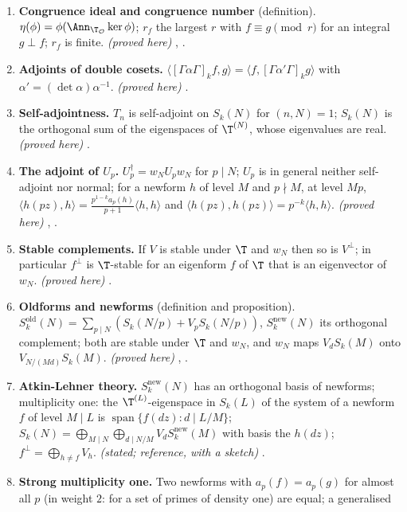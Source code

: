 \begin{enumerate}[label=\textbf{\thechapter.\arabic*}]
\item \textbf{Congruence ideal and congruence number} (definition). $\eta(\phi)=\phi(\Ann_{\T_{\mathcal O}}\ker\phi)$; $r_f$ the largest $r$ with $f\equiv g\pmod r$ for an integral
$g\perp f$; $r_f$ is finite. \emph{(proved here)} , .
\item \textbf{Adjoints of double cosets.} $\langle[\Gamma\alpha\Gamma]_kf,g\rangle=\langle f,[\Gamma\alpha'\Gamma]_kg\rangle$ with $\alpha'=(\det\alpha)\alpha^{-1}$. \emph{(proved here)}
.
\item \textbf{Self-adjointness.} $T_n$ is self-adjoint on $S_k(N)$ for $(n,N)=1$; $S_k(N)$ is the orthogonal sum of the eigenspaces of $\T^{(N)}$, whose eigenvalues are real.
\emph{(proved here)} .
\item \textbf{The adjoint of $U_p$.} $U_p^\dagger=w_NU_pw_N$ for $p\mid N$; $U_p$ is in general neither self-adjoint nor normal; for a newform $h$ of level $M$ and $p\nmid M$,
at level $Mp$, $\langle h(pz),h\rangle=\frac{p^{1-k}a_p(h)}{p+1}\langle h,h\rangle$ and $\langle h(pz),h(pz)\rangle=p^{-k}\langle h,h\rangle$. \emph{(proved here)} ,
.
\item \textbf{Stable complements.} If $V$ is stable under $\T$ and $w_N$ then so is $V^\perp$; in particular $f^\perp$ is $\T$-stable for an eigenform $f$ of $\T$ that is an
eigenvector of $w_N$. \emph{(proved here)} .
\item \textbf{Oldforms and newforms} (definition and proposition). $S_k^{\mathrm{old}}(N)=\sum_{p\mid N}(S_k(N/p)+V_pS_k(N/p))$, $S_k^{\mathrm{new}}(N)$ its orthogonal complement;
both are stable under $\T$ and $w_N$, and $w_N$ maps $V_dS_k(M)$ onto $V_{N/(Md)}S_k(M)$. \emph{(proved here)} , .
\item \textbf{Atkin-Lehner theory.} $S_k^{\mathrm{new}}(N)$ has an orthogonal basis of newforms; multiplicity one: the $\T^{(L)}$-eigenspace in $S_k(L)$ of the system of a newform
$f$ of level $M\mid L$ is $\operatorname{span}\{f(dz):d\mid L/M\}$; $S_k(N)=\bigoplus_{M\mid N}\bigoplus_{d\mid N/M}V_dS_k^{\mathrm{new}}(M)$ with basis the $h(dz)$; $f^\perp=\bigoplus_{h\ne f}V_h$.
\emph{(stated; reference, with a sketch)} .
\item \textbf{Strong multiplicity one.} Two newforms with $a_p(f)=a_p(g)$ for almost all $p$ (in weight $2$: for a set of primes of density one) are equal; a generalised

\end{enumerate}
